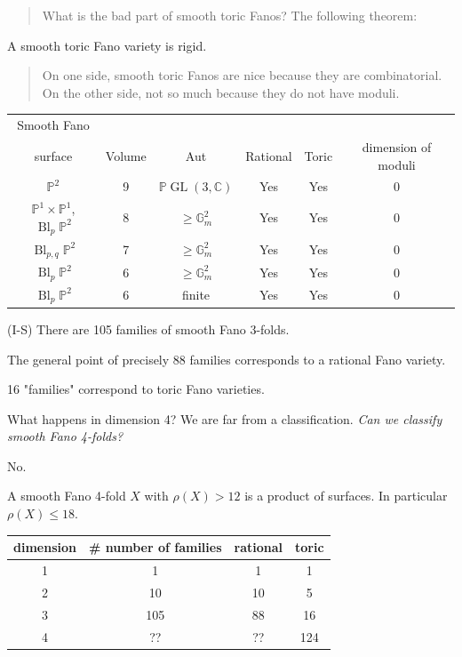 \begin{quotation}
	What is the bad part of smooth toric Fanos? The following theorem:
\end{quotation}

\begin{thm}[Cox]
	A smooth toric Fano variety is rigid.
\end{thm}

\begin{quotation}
	On one side, smooth toric Fanos are nice because they are combinatorial. On the other side, not so much because they do not have moduli.
\end{quotation}

\begin{tabular}{cccccc}
	Smooth Fano\\surface&Volume&Aut&Rational&Toric&dimension of moduli\\\hline\hline
	$\mathbb{P}^{2}$&9& $\mathbb{P}\operatorname{GL}(3,\mathbb{C})$&Yes&Yes&0\\\hline
	$\mathbb{P}^{1} \times \mathbb{P}^{1}$, $\operatorname{Bl}_{p}\mathbb{P}^{2}$&8&$\geq \mathbb{G}^{2}_{m}$&Yes&Yes&0\\\hline
	$\operatorname{Bl}_{p,q}\mathbb{P}^{2}$&7&$\geq \mathbb{G}^{2}_{m}$&Yes&Yes&0\\\hline
	$\operatorname{Bl}_{p}\mathbb{P}^{2}$&6&$\geq \mathbb{G}^{2}_{m}$&Yes&Yes&0\\\hline
	$\operatorname{Bl}_{p}\mathbb{P}^{2}$&6&finite&Yes&Yes&0\\\hline
\end{tabular}

\begin{thm}\leavevmode
	(I-S) There are 105 families of smooth Fano 3-folds.

	The general point of precisely 88 families corresponds to a rational Fano variety.

	16 "families" correspond to toric Fano varieties.
\end{thm}

\begin{question}
	What happens in dimension 4? We are far from a classification. \textit{Can we classify smooth Fano 4-folds?}

	\hfill No.
\end{question}

\begin{thm}[Casagrande,24]
	A smooth Fano 4-fold $X$ with $\rho(X)>12$ is a product of surfaces. In particular $\rho(X)\leq 18$.
\end{thm}
\begin{center}
\begin{tabular}{|c|c|c|c|}
	\hline
	dimension&\# number of families&rational&toric\\\hline
	1&1&1&1\\\hline
	2&10&10&5\\\hline
	3&105&88&16\\\hline
	4&??&??&124\\\hline
\end{tabular}\end{center}

